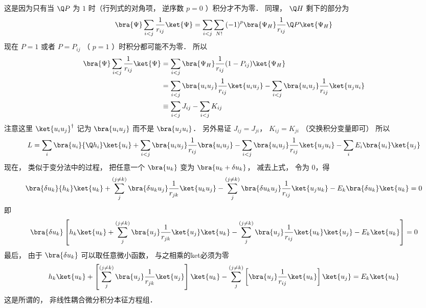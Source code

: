 这是因为只有当 $\Q P$ 为 $1$ 时（行列式的对角项， 逆序数 $p = 0$ ）积分才不为零． 同理， $\Q H$ 剩下的部分为
\begin{equation}
\bra{\Psi}\sum\limits_{i < j} {\frac{1}{r_{ij}}} \ket{\Psi}  = \sum\limits_{i < j} {\sum\limits_{N!} {{{( - 1)}^p}\bra{\Psi_H}\frac{1}{r_{ij}}\Q P \ket{\Psi_H} } } 
\end{equation}
现在 $P = 1$ 或者 $P = {P_{ij}}$ （ $p=1$ ）时积分都可能不为零． 所以
 \begin{equation}
\begin{aligned}
  \bra{\Psi}\sum\limits_{i < j} {\frac{1}{r_{ij}}} \ket{\Psi} & = \sum\limits_{i < j} {\bra{\Psi_H}\frac{1}{r_{ij}}(1 - {P_{ij}}) \ket{\Psi_H} }  \\
  &= \sum\limits_{i < j} {\bra{{u_i}{u_j}}\frac{1}{r_{ij}} \ket{{u_i}{u_j}}}  - \sum\limits_{i < j} {\bra{{u_i}{u_j}}\frac{1}{r_{ij}} \ket{{u_j}{u_i}} } \\
  & \equiv \sum\limits_{i < j} {J_{ij}}  - \sum\limits_{i < j} {K_{ij}} \\ 
\end{aligned}
\end{equation}
注意这里 ${ \ket{{u_i}{u_j}} ^\dag }$ 记为 $\bra{{u_i}{u_j}}$ 而不是 $\bra{{u_j}{u_i}}$．  另外易证 ${J_{ij}} = {J_{ji}}$，  ${K_{ij}} = {K_{ji}}$ （交换积分变量即可） 所以
 \begin{equation}
L = \sum\limits_i {\bra{u_i}{\Q h_i} \ket{u_i} }  + \sum\limits_{i < j} {\bra{{u_i}{u_j}}\frac{1}{r_{ij}} \bra{{u_i}{u_j}} }  - \sum\limits_{i < j} {\bra{{u_i}{u_j}} \frac{1}{r_{ij}} \ket{{u_j}{u_i}}  }  - \sum\limits_i {E_i}\bra{u_i}\ket{u_j}
\end{equation}
现在， 类似于变分法中的过程， 把任意一个 $\bra{u_k}$ 变为 $\bra{{u_k} + \delta {u_k}}$，  减去上式， 令为 $0$，得
 \begin{equation}
\bra{\delta {u_k}}{h_k} \ket{u_k}  + \sum\limits_j^{(j \ne k)} {\bra{\delta {u_k}{u_j}}\frac{1}{r_{jk}} \ket{{u_k}{u_j}} }  - \sum\limits_j^{(j \ne k)} {\bra{\delta {u_k}{u_j}}\frac{1}{r_{ij}}\ket{{u_j}{u_k}} }  - {E_k}\bra{\delta u_k}\ket{u_k}  = 0
\end{equation}
即
 \begin{equation}
\bra{\delta {u_k}}\left[ {{h_k} \ket{u_k}  + \sum\limits_j^{(j \ne k)} {\bra{u_j} \frac{1}{r_{jk}} \ket{u_j} \ket{u_k} }  - \sum\limits_j^{(j \ne k)} {\bra{u_j}\frac{1}{r_{ij}} \ket{u_k} \ket{u_j} }  - {E_k} \ket{u_k} } \right] = 0
\end{equation}
最后， 由于 $\bra{\delta {u_k}}$ 可以取任意微小函数， 与之相乘的ket必须为零
 \begin{equation}
{h_k} \ket{u_k}  + \left[ {\sum\limits_j^{(j \ne k)} {\bra{u_j}\frac{1}{r_{jk}} \ket{u_j}} } \right] \ket{u_k}  - \sum\limits_j^{(j \ne k)} {\left[ {\bra{u_j}\frac{1}{r_{ij}}  \ket{u_k}} \right] \ket{u_j} }  = {E_k} \ket{u_k} 
\end{equation}
这是所谓的， 非线性耦合微分积分本征方程组．

